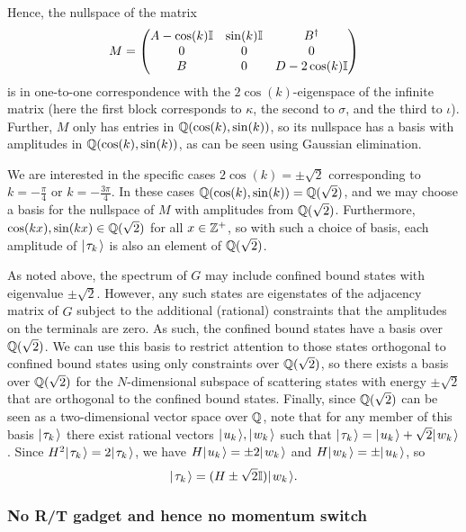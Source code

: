 \documentclass[../thesis-main/thesis-main]{subfiles}
\begin{document}
Hence, the nullspace of the matrix
\[
  M= \begin{pmatrix} A -\cos(k) \mathbb{I} & \sin(k) \mathbb{I} & B^\dag\\
    0 & 0 & 0\\
    B & 0 & D-2\cos(k)\mathbb{I}\end{pmatrix}
\]
is in one-to-one correspondence with the $2\cos(k)$-eigenspace of the infinite matrix (here the first block corresponds to $\kappa$, the second to $\sigma$, and the third to $\iota$). Further, $M$ only has entries in $\mathbb{Q}(\cos(k),\sin(k))$, so its nullspace has a basis with amplitudes in $\mathbb{Q}(\cos(k),\sin(k))$, as can be seen using Gaussian elimination.

We are interested in the specific cases $2\cos(k)=\pm\sqrt{2}$ corresponding to $k = -\frac{\pi}{4}$ or $k = -\frac{3\pi}{4}$.  In these cases $\mathbb{Q}(\cos(k),\sin(k)) = \mathbb{Q}(\sqrt{2})$, and we may choose a basis for the nullspace of $M$ with amplitudes from $\mathbb{Q}(\sqrt{2})$. Furthermore, $\cos(kx), \sin(kx) \in \mathbb{Q}(\sqrt{2})$ for all $x\in \mathbb{Z}^+$, so with such a choice of basis, each amplitude of $|\mspace{2mu} \tau_k \mspace{2mu} \rangle$ is also an element of $\mathbb{Q}(\sqrt{2})$.

As noted above, the spectrum of $G$ may include confined bound states \cite{CG12} with eigenvalue $\pm\sqrt2$.  However, any such states are eigenstates of the adjacency matrix of $\hat{G}$ subject to the additional (rational) constraints that the amplitudes on the terminals are zero.  As such, the confined bound states have a basis over $\mathbb{Q}(\sqrt{2})$. We can use this basis to restrict attention to those states orthogonal to confined bound states using only constraints over $\mathbb{Q}(\sqrt{2})$, so there exists a basis over $\mathbb{Q}(\sqrt{2})$ for the $N$-dimensional subspace of scattering states with energy $\pm\sqrt{2}$ that are orthogonal to the confined bound states. Finally, since $\mathbb{Q}(\sqrt{2})$ can be seen as a two-dimensional vector space over $\mathbb{Q}$, note that for any member of this basis $|\mspace{2mu} \tau_k \mspace{2mu} \rangle$ there exist rational vectors $|\mspace{2mu} u_k \mspace{2mu} \rangle,|\mspace{2mu} w_k \mspace{2mu} \rangle$ such that $|\mspace{2mu} \tau_k \mspace{2mu} \rangle=|\mspace{2mu} u_k \mspace{2mu} \rangle + \sqrt{2}|\mspace{2mu} w_k \mspace{2mu} \rangle$. Since $H^2|\mspace{2mu} \tau_k \mspace{2mu} \rangle=2|\mspace{2mu} \tau_k \mspace{2mu} \rangle$, we have $H|\mspace{2mu} u_k \mspace{2mu} \rangle=\pm 2|\mspace{2mu} w_k \mspace{2mu} \rangle$ and $H|\mspace{2mu} w_k \mspace{2mu} \rangle = \pm |\mspace{2mu} u_k \mspace{2mu} \rangle$, so
\begin{equation}
  |\mspace{2mu} \tau_k \mspace{2mu} \rangle=(H \pm \sqrt{2} \mathbb{I})|\mspace{2mu} w_k \mspace{2mu} \rangle.\label{eq:form_of_tau}
\end{equation}

\subsubsection{No R/T gadget and hence no momentum switch}
\end{document}
